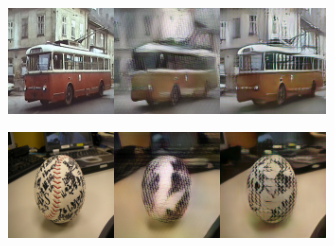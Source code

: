 \begin{table}[t]
\begin{minipage}{0.375\textwidth}
\begin{center}
\includegraphics[width=0.63\textwidth]{figs/vgg16/rec_tile_1.jpg}

\includegraphics[width=0.63\textwidth]{figs/vgg16/rec_tile_2.jpg}
\end{center}
\end{minipage}
\vspace{-0.8 cm}
\end{table}

